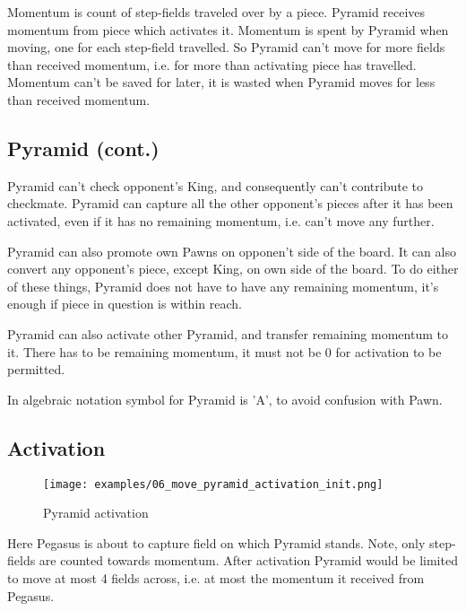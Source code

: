 Momentum is count of step-fields traveled over by a piece. Pyramid receives
momentum from piece which activates it. Momentum is spent by Pyramid when
moving, one for each step-field travelled. So Pyramid can't move for more
fields than received momentum, i.e. for more than activating piece has
travelled. Momentum can't be saved for later, it is wasted when Pyramid
moves for less than received momentum.

\clearpage %

\subsection*{Pyramid (cont.)}

Pyramid can't check opponent's King, and consequently can't contribute to
checkmate. Pyramid can capture all the other opponent's pieces after it has
been activated, even if it has no remaining momentum, i.e. can't move any
further.

Pyramid can also promote own Pawns on opponen't side of the board. It can
also convert any opponent's piece, except King, on own side of the board.
To do either of these things, Pyramid does not have to have any remaining
momentum, it's enough if piece in question is within reach.

Pyramid can also activate other Pyramid, and transfer remaining momentum to it.
There has to be remaining momentum, it must not be 0 for activation to be permitted.

In algebraic notation symbol for Pyramid is 'A', to avoid confusion with Pawn.

\clearpage %

\subsection*{Activation}

\noindent
\begin{figure}[!h]
\texttt{[image: examples/06\_move\_pyramid\_activation\_init.png]}
\caption{Pyramid activation}
\label{fig:06_move_pyramid_activation_init}
\end{figure}

Here Pegasus is about to capture field on which Pyramid stands. Note, only
step-fields are counted towards momentum. After activation Pyramid would be
limited to move at most 4 fields across, i.e. at most the momentum it received
from Pegasus.

